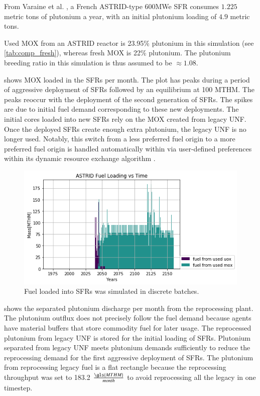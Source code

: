 From Varaine et al. \cite{varaine_pre-conceptual_2012}, a French
ASTRID-type 600\gls{MWe} \gls{SFR} consumes $1.225$ metric tons of
plutonium a year, with an initial plutonium loading of $4.9$ metric tons. 
 
Used \gls{MOX} from an ASTRID reactor is 23.95\% plutonium
in this simulation (see \cref{tab:comp_fresh}), whereas fresh \gls{MOX} is 22\% plutonium.
The plutonium breeding ratio in this simulation is thus assumed to be
$\approx 1.08$.

 shows \gls{MOX} loaded in the \glspl{SFR} per month.  The plot 
has peaks during a period of aggressive deployment of \glspl{SFR} followed by 
an equilibrium at 100 \gls{MTHM}. The peaks reoccur with the deployment of the 
second generation of \glspl{SFR}.  The spikes are due to initial fuel demand 
corresponding to these new deployments.  The initial cores loaded into new 
\glspl{SFR} rely on the \gls{MOX} created from legacy \gls{UNF}. Once the 
deployed \glspl{SFR} create enough extra plutonium, the legacy \gls{UNF} is no 
longer used. Notably, this switch from a less preferred fuel origin to a more 
preferred fuel origin is handled automatically within \Cyclus via user-defined preferences 
within its dynamic resource exchange algorithm \cite{gidden_methodology_2016}.


\begin{figure}[htbp!]
	\begin{center}
		\includegraphics[width=1.0\textwidth]{./images/french-transition/where_fuel.png}
	\end{center}
	\caption{Fuel loaded into \glspl{SFR} was simulated in discrete 
        batches.}
	\label{fig:fuel}
\end{figure}

 shows the separated plutonium discharge per month from the reprocessing plant. The plutonium outflux does not precisely follow the fuel demand because \Cyclus agents have material buffers that store commodity fuel for later usage. The reprocessed plutonium from legacy \gls{UNF} is stored for the initial loading of \glspl{SFR}.  Plutonium separated from legacy \gls{UNF} meets plutonium demands sufficiently to reduce the reprocessing demand for the first aggressive deployment of \glspl{SFR}.  The plutonium from reprocessing legacy fuel is a flat rectangle because the reprocessing throughput was set to 183.2 $\frac{\gls{MTHM}}{month}$ to avoid reprocessing all the legacy in one timestep. 
 


